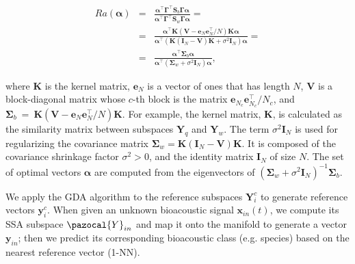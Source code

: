 \begin{eqnarray}
Ra(\bm{\alpha}) &=& \frac{\bm{\alpha}^{\top}\bm{\Gamma}^{\top}\bm{S}_{b}\bm{\Gamma} \bm{\alpha}}{\bm{\alpha}^{\top}\bm{\Gamma} ^{\top}\bm{S}_{w}\bm{\Gamma} \bm{\alpha}} = \nonumber\\ 
&=& \frac{\bm{\alpha}^{\top}\bm{K}(\bm{V} - \bm{e}_{N}\bm{e}_{N}^{\top}/N)\bm{K}\bm{\alpha}}{\bm{\alpha}^{\top}(\bm{K}(\bm{I}_{N}-\bm{V})\bm{K}+ \sigma^{2}\bm{I}_{N})\bm{\alpha}} = \nonumber\\
&=& \frac{\bm{\alpha}^{\top}\bm{\Sigma}_{b}\bm{\alpha}}{\bm{\alpha}^{\top}(\bm{\Sigma}_{w}+\sigma^{2}\bm{I}_{N})\bm{\alpha}},
\end{eqnarray}


\noindent where $\bm{K}$ is the kernel matrix, $\bm{e}_{N}$ is a vector
of ones that has length $N$, $\bm{V}$ is a block-diagonal matrix
whose $c$-th block is the matrix $\bm{e}_{N_{c}}\bm{e}_{N_{c}}^{\top}/ N_{c}$, and $\bm{\Sigma}_{b}~=~\bm{K}(\bm{V} - \bm{e}_{N}\bm{e}_{N}^{\top}/N)\bm{K}$. 
For example, the kernel matrix, $\bm{K}$, is calculated as the similarity matrix between subspaces $\bm{Y}_{q}$ and $\bm{Y}_{w}$.
The term $\sigma^{2} \bm{I}_{N}$ is used for regularizing the covariance matrix $\bm{\Sigma}_{w} = \bm{K}(\bm{I}_{N}  -\bm{V})\bm{K}$. It is composed of the covariance shrinkage factor $\sigma^{2} > 0$, and the identity matrix $\bm{I}_{N}$ of size $N$. The set of optimal vectors $\bm{\alpha}$ are computed from the eigenvectors of $(\bm{\Sigma}_{w}+\sigma^{2}\bm{I}_{N})^{-1}\bm{\Sigma}_{b}$. 

We apply the GDA algorithm to the reference subspaces $\bm{Y}_{i}^{c}$ to generate reference vectors $\bm{y}_{i}^{c}$. When given an unknown bioacoustic signal $\bm{x}_{in}(t)$, we compute its SSA subspace $\pazocal{Y}_{in}$ and map it onto the manifold to generate a vector $\bm{y}_{in}$; then we predict its corresponding bioacoustic class (e.g. species)  based on the nearest reference vector (1-NN).


